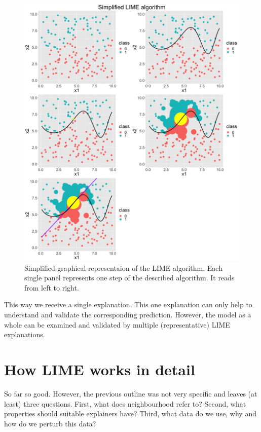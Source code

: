 \documentclass[]{krantz}
\begin{document}
\begin{figure}

{\centering \includegraphics[width=0.99\linewidth]{images/lime} 

}

\caption{Simplified graphical representaion of the LIME algorithm. Each single panel represents one step of the described algorithm. It reads from left to right.}\label{fig:unnamed-chunk-63}
\end{figure}

This way we receive a single explanation. This one explanation can only
help to understand and validate the corresponding prediction. However,
the model as a whole can be examined and validated by multiple
(representative) LIME explanations.

\section{How LIME works in detail}\label{how-lime-works-in-detail}

So far so good. However, the previous outline was not very specific and
leaves (at least) three questions. First, what does neighbourhood refer
to? Second, what properties should suitable explainers have? Third, what
data do we use, why and how do we perturb this data?
\end{document}
